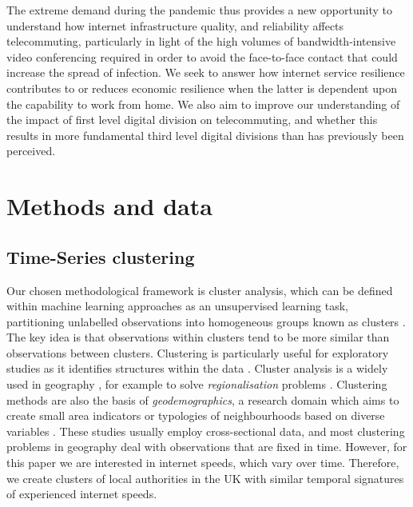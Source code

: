 \documentclass[Royal,times,sageh]{sagej}
\begin{document}
The extreme demand during the pandemic thus provides a new opportunity
to understand how internet infrastructure quality, and reliability
affects telecommuting, particularly in light of the high volumes of
bandwidth-intensive video conferencing required in order to avoid the
face-to-face contact that could increase the spread of infection. We
seek to answer how internet service resilience contributes to or reduces
economic resilience when the latter is dependent upon the capability to
work from home. We also aim to improve our understanding of the impact
of first level digital division on telecommuting, and whether this
results in more fundamental third level digital divisions than has
previously been perceived.

\hypertarget{sec:3}{%
\section{Methods and data}\label{sec:3}}

\hypertarget{sec:3.1}{%
\subsection{Time-Series clustering}\label{sec:3.1}}

Our chosen methodological framework is cluster analysis, which can be
defined within machine learning approaches as an unsupervised learning
task, partitioning unlabelled observations into homogeneous groups known
as clusters \citep{montero2014tsclust}. The key idea is that
observations within clusters tend to be more similar than observations
between clusters. Clustering is particularly useful for exploratory
studies as it identifies structures within the data
\citep{aghabozorgi2015time}. Cluster analysis is a widely used in
geography \citep{gordon1977classification, everitt1974cluster}, for
example to solve \emph{regionalisation} problems
\citep{niesterowicz2016}. Clustering methods are also the basis of
\emph{geodemographics}, a research domain which aims to create small
area indicators or typologies of neighbourhoods based on diverse
variables \citep{SINGLETON2009289, harris2005geodemographics}. These
studies usually employ cross-sectional data, and most clustering
problems in geography deal with observations that are fixed in time.
However, for this paper we are interested in internet speeds, which vary
over time. Therefore, we create clusters of local authorities in the UK
with similar temporal signatures of experienced internet speeds.
\end{document}
